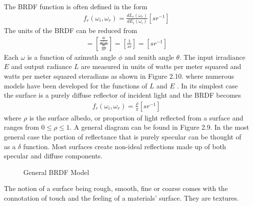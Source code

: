 The BRDF function is often defined in the form
%
\begin{align}
    f_r(\omega_i, \omega_r) = \frac{dL_r(\omega_r)}{dE_i(\omega_i)}[{sr}^{-1}]
\end{align}
%
The units of the BRDF can be reduced from
\begin{align}
    [\frac{dL_r(\omega_r) units}{dE_i(\omega_i) units}] = [\frac{\frac{W}{m^2sr}}{\frac{W}{m^2}}] = [\frac{1}{sr}] = [{sr}^{-1}]
\end{align}
Each $\omega$ is a function of azimuth angle $\phi$ and zenith angle $\theta$. The input irradiance $E$ and output radiance $L$ are measured in units of watts per meter squared and watts per meter squared steradians as shown in Figure 2.10.
where numerous models have been developed for the functions of $L$ and $E$ \cite{sparrow}\cite{brdfoverview}.  In its simplest case the surface is a purely diffuse reflector of incident light and the BRDF becomes
%
\begin{align}
    f_r(\omega_i, \omega_r) = \frac{\rho}{\pi}[{sr}^{-1}]
\end{align}
%
where $\rho$ is the surface albedo, or proportion of light reflected from a surface \cite{nicodemus} and ranges from $0\leq\rho\leq1$.  A general diagram can be found in Figure 2.9.  In the most general case the portion of reflectance that is purely specular can be thought of as a $\delta$ function.  Most surfaces create non-ideal reflections made up of both specular and diffuse components.
%
\begin{figure}
    \begin{center}
    \end{center}
    \caption{General BRDF Model}
    \label{fig:scattering}
\end{figure}
%
The notion of a surface being rough, smooth, fine or coarse comes with the connotation of touch and the feeling of a materials' surface.  They are textures.
